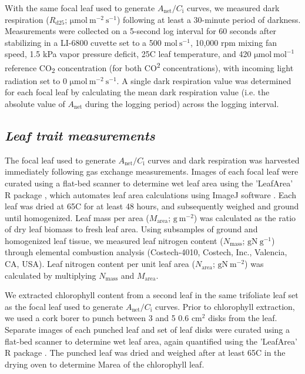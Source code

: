 With the same focal leaf used to generate $A_\mathrm{{net}}/C_\mathrm{i}$ curves, we measured dark respiration ($R_\mathrm{{d25}}$; $\mathrm{\mu mol\ m^{-2}\ s^{-1}}$) following at least a 30-minute period of darkness. Measurements were collected on a 5-second log interval for 60 seconds after stabilizing in a LI-6800 cuvette set to a 500 $\mathrm{mol\ s^{-1}}$, 10,000 rpm mixing fan speed, 1.5 kPa vapor pressure deficit, 25\textdegree{}C leaf temperature, and 420 $\mathrm{\mu mol\ mol^{-1}}$ reference CO\textsubscript{2} concentration (for both CO\textsuperscript{2} concentrations), with incoming light radiation set to 0 $\mathrm{\mu mol\ m^{-2}\ s^{-1}}$. A single dark respiration value was determined for each focal leaf by calculating the mean dark respiration value (i.e. the absolute value of $A_\mathrm{{net}}$ during the logging period) across the logging interval.

\subsection{\textit{Leaf trait measurements}}

The focal leaf used to generate $A_\mathrm{{net}}/C_\mathrm{i}$ curves and dark respiration was harvested immediately following gas exchange measurements. Images of each focal leaf were curated using a flat-bed scanner to determine wet leaf area using the 'LeafArea' R package , which automates leaf area calculations using ImageJ software . Each leaf was dried at 65\textdegree{}C for at least 48 hours, and subsequently weighed and ground until homogenized. Leaf mass per area ($M_\mathrm{area}$; $\mathrm{g\ m^{-2}}$) was calculated as the ratio of dry leaf biomass to fresh leaf area. Using subsamples of ground and homogenized leaf tissue, we measured leaf nitrogen content ($N_\mathrm{mass}$; $\mathrm{g N\ g^{-1}}$) through elemental combustion analysis (Costech-4010, Costech, Inc., Valencia, CA, USA). Leaf nitrogen content per unit leaf area ($N_\mathrm{area}$; $\mathrm{g N\ m^{-2}}$) was calculated by multiplying $N_\mathrm{mass}$ and $M_\mathrm{area}$.

We extracted chlorophyll content from a second leaf in the same trifoliate leaf set as the focal leaf used to generate $A_\mathrm{{net}}/C_\mathrm{i}$ curves. Prior to chlorophyll extraction, we used a cork borer to punch between 3 and 5 0.6 $\mathrm{cm^{2}}$ disks from the leaf. Separate images of each punched leaf and set of leaf disks were curated using a flat-bed scanner to determine wet leaf area, again quantified using the 'LeafArea' R package . The punched leaf was dried and weighed after at least 65\textdegree{}C in the drying oven to determine Marea of the chlorophyll leaf.
    
